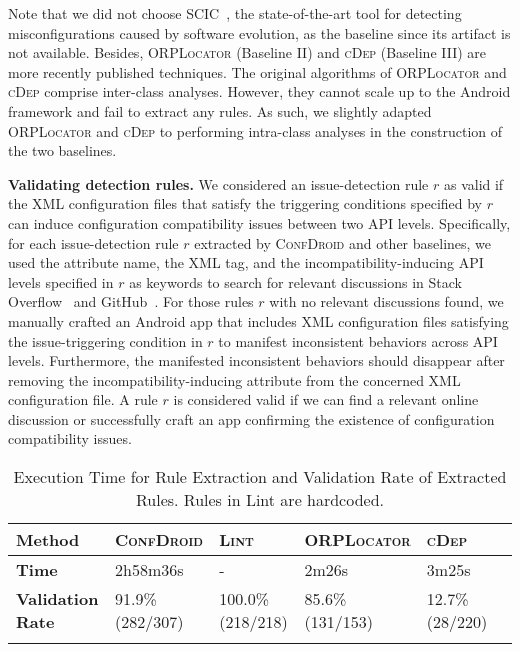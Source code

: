 Note that we did not choose \textsc{SCIC}~\cite{behrang2015users}, the state-of-the-art tool for detecting misconfigurations caused by software evolution, as the baseline since its artifact is not available. Besides,
\textsc{ORPLocator} (Baseline II) and \textsc{cDep} (Baseline III) are more recently published techniques.
The original algorithms of \textsc{ORPLocator} and \textsc{cDep} comprise
inter-class analyses. However, they cannot scale up to the Android framework
and fail to extract any rules. 
As such, we slightly adapted \textsc{ORPLocator} and \textsc{cDep} to
performing intra-class analyses in the construction of the two baselines.

\textbf{Validating detection rules.}
We considered an issue-detection rule $r$ as valid if the XML configuration
files that satisfy the triggering conditions specified by $r$ can induce
configuration compatibility issues between two API levels.
Specifically, for each issue-detection rule $r$ extracted by \textsc{ConfDroid} and other baselines,
we used the attribute name, the XML tag, and the incompatibility-inducing API levels
specified in $r$ as keywords to search for relevant discussions in Stack
Overflow~\cite{stackoverflow} and GitHub~\cite{github}.
For those rules $r$ with no relevant discussions found, we manually crafted an
Android app that includes XML configuration files satisfying the
issue-triggering condition in $r$ to manifest inconsistent behaviors
across API levels.
Furthermore, the manifested inconsistent behaviors should disappear after
removing the incompatibility-inducing attribute from the concerned XML configuration file.
A rule $r$ is considered valid if we can find a relevant online discussion or
successfully craft an app confirming the existence of configuration
compatibility issues.

\begin{table}[t]
	\caption{Execution Time for Rule Extraction and Validation Rate of
	Extracted Rules. Rules in Lint are hardcoded.}
	\centering
	\begin{center}
	\begin{tabular}{p{40pt}p{40pt}p{30pt}p{40pt}p{35pt}l}
		\toprule
		\textbf{Method} {\centering}   &  {\centering \textsc{ConfDroid}} &  {\centering \textsc{Lint}}  & \textsc{ORPLocator} {\centering} &{ \centering \textsc{cDep}} \\ \hline
				 		\textbf{Time}  &  2h58m36s  & - & 2m26s & 3m25s  \\\hline
		 \textbf{Validation Rate}  &   91.9\% (282/307)  & 100.0\% (218/218) &
		 85.6\% (131/153) & 12.7\% (28/220) \\

\bottomrule& & &
\label{tab:ruleextraction}	\end{tabular}
\end{center}
\end{table}

